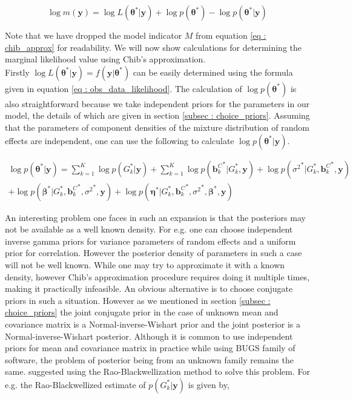 \begin{equation}
\label{eq : chib_approx}
\log{\hat{m}(\boldsymbol{y})} = \log{L(\boldsymbol{\theta}^*|\boldsymbol{y})} + \log{p(\boldsymbol{\theta}^*)} - \log{p(\boldsymbol{\theta}^*|\boldsymbol{y})}
\end{equation}

Note that we have dropped the model indicator $M$ from equation \ref{eq : chib_approx} for readability. We will now show calculations for determining the marginal likelihood value using Chib's approximation.\\ 

Firstly $\log{L(\boldsymbol{\theta}^*|\boldsymbol{y})} = f(\boldsymbol{y}|\boldsymbol{\theta}^*)$ can be easily determined using the formula given in equation \ref{eq : obs_data_likelihood}. The calculation of $\log{p(\boldsymbol{\theta}^*)}$ is also straightforward because we take independent priors for the parameters in our model, the details of which are given in section \ref{subsec : choice_priors}. Assuming that the parameters of component densities of the mixture distribution of random effects are independent, one can use the following to calculate $\log{p(\boldsymbol{\theta}^*|\boldsymbol{y})}$.

\begin{multline}
\log{p(\boldsymbol{\theta}^*|\boldsymbol{y})} = 
\sum_{k=1}^K{\log{p(G_k^*|\boldsymbol{y})}} + 
\sum_{k=1}^K{\log{p({\boldsymbol{b}_k^C}^*|G_k^*, \boldsymbol{y})}} + 
\log{p({\sigma^2}^*|G_k^*, {\boldsymbol{b}_k^C}^*, \boldsymbol{y})}\\
+ \log{p({\boldsymbol{\beta}}^*|G_k^*, {\boldsymbol{b}_k^C}^*, {\sigma^2}^*, \boldsymbol{y})} + 
\log{p({\boldsymbol{\eta}}^*|G_k^*, {\boldsymbol{b}_k^C}^*, {\sigma^2}^*,{\boldsymbol{\beta}}^*, \boldsymbol{y})}
\end{multline}

An interesting problem one faces in such an expansion is that the posteriors may not be available as a well known density. For e.g. one can choose independent inverse gamma priors for variance parameters of random effects and a uniform prior for correlation. However the posterior density of parameters in such a case will not be well known. While one may try to approximate it with a known density, however Chib's approximation procedure requires doing it multiple times, making it practically infeasible. An obvious alternative is to choose conjugate priors in such a situation. However as we mentioned in section \ref{subsec : choice_priors} the joint conjugate prior in the case of unknown mean and covariance matrix is a Normal-inverse-Wishart prior and the joint posterior is a Normal-inverse-Wishart posterior. Although it is common to use independent priors for mean and covariance matrix in practice while using BUGS family of software, the problem of posterior being from an unknown family remains the same. \citet{chib_marginal_1995} suggested using the Rao-Blackwellization method to solve this problem. For e.g. the Rao-Blackwellized estimate of $p(G_k^*|\boldsymbol{y})$ is given by,

